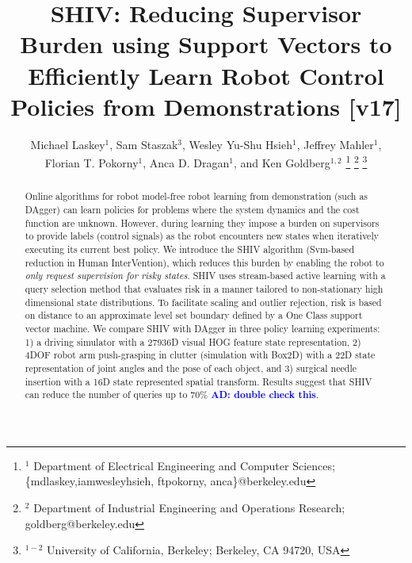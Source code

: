 \documentclass[10pt, conference]{ieeeconf}      %
\title{SHIV: Reducing Supervisor Burden using Support Vectors to Efficiently Learn Robot Control Policies from Demonstrations [v17]}
\author{Michael Laskey$^1$, Sam Staszak$^3$, Wesley Yu-Shu Hsieh$^1$, Jeffrey Mahler$^1$, \\ Florian T. Pokorny$^1$, Anca D. Dragan$^1$, and Ken Goldberg$^{1,2}$%
\thanks{$^1$ Department of Electrical Engineering and Computer Sciences; {\small \{mdlaskey,iamwesleyhsieh, ftpokorny, anca\}@berkeley.edu}}%
\thanks{$^2$ Department of Industrial Engineering and Operations Research; {\small goldberg@berkeley.edu}}%
\thanks{$^{1-2}$ University of California, Berkeley;  Berkeley, CA 94720, USA}%
}
\newcommand{\adnote}[1]{\ifthenelse{\boolean{include-notes}}%
 {\textcolor{blue}{\textbf{AD: #1}}}{}}
\begin{document}
\maketitle
\thispagestyle{empty}
\pagestyle{empty}



\begin{abstract}
Online algorithms for robot model-free robot learning from demonstration (such as DAgger) can learn policies for problems where the system
dynamics and the cost function are unknown. However, during learning they impose a burden on supervisors to provide labels (control
signals) as the robot encounters new states when iteratively executing its current best policy. We introduce the SHIV
algorithm (Svm-based reduction in Human InterVention), which reduces this burden by enabling the robot to \emph{only request supervision for risky states}. SHIV uses stream-based active learning with a query selection method that evaluates risk in a manner tailored to non-stationary high dimensional state distributions.  To facilitate scaling and outlier rejection, risk is based on distance to an approximate level set boundary defined by a One Class support vector machine.  We compare SHIV with DAgger in three policy learning experiments: 1) a driving simulator with a 27936D visual HOG feature state representation, 2) 4DOF robot arm push-grasping in clutter (simulation with Box2D) with a 22D state representation  of joint angles and the pose of each object, and 3) surgical needle insertion with a 16D state represented spatial transform.  Results suggest that SHIV can reduce the number of queries up to 70$\%$\adnote{double check this}.




\end{abstract}
\end{document}
